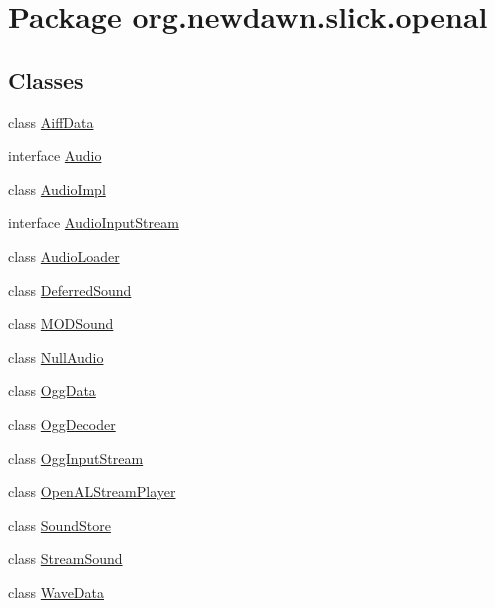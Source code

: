 \hypertarget{namespaceorg_1_1newdawn_1_1slick_1_1openal}{}\section{Package org.\+newdawn.\+slick.\+openal}
\label{namespaceorg_1_1newdawn_1_1slick_1_1openal}
\subsection*{Classes}
\begin{DoxyCompactItemize}
\item 
class \mbox{\hyperlink{classorg_1_1newdawn_1_1slick_1_1openal_1_1_aiff_data}{Aiff\+Data}}
\item 
interface \mbox{\hyperlink{interfaceorg_1_1newdawn_1_1slick_1_1openal_1_1_audio}{Audio}}
\item 
class \mbox{\hyperlink{classorg_1_1newdawn_1_1slick_1_1openal_1_1_audio_impl}{Audio\+Impl}}
\item 
interface \mbox{\hyperlink{interfaceorg_1_1newdawn_1_1slick_1_1openal_1_1_audio_input_stream}{Audio\+Input\+Stream}}
\item 
class \mbox{\hyperlink{classorg_1_1newdawn_1_1slick_1_1openal_1_1_audio_loader}{Audio\+Loader}}
\item 
class \mbox{\hyperlink{classorg_1_1newdawn_1_1slick_1_1openal_1_1_deferred_sound}{Deferred\+Sound}}
\item 
class \mbox{\hyperlink{classorg_1_1newdawn_1_1slick_1_1openal_1_1_m_o_d_sound}{M\+O\+D\+Sound}}
\item 
class \mbox{\hyperlink{classorg_1_1newdawn_1_1slick_1_1openal_1_1_null_audio}{Null\+Audio}}
\item 
class \mbox{\hyperlink{namespaceorg_1_1newdawn_1_1slick_1_1openal_classorg_1_1newdawn_1_1slick_1_1openal_1_1_ogg_data}{Ogg\+Data}}
\item 
class \mbox{\hyperlink{classorg_1_1newdawn_1_1slick_1_1openal_1_1_ogg_decoder}{Ogg\+Decoder}}
\item 
class \mbox{\hyperlink{classorg_1_1newdawn_1_1slick_1_1openal_1_1_ogg_input_stream}{Ogg\+Input\+Stream}}
\item 
class \mbox{\hyperlink{classorg_1_1newdawn_1_1slick_1_1openal_1_1_open_a_l_stream_player}{Open\+A\+L\+Stream\+Player}}
\item 
class \mbox{\hyperlink{classorg_1_1newdawn_1_1slick_1_1openal_1_1_sound_store}{Sound\+Store}}
\item 
class \mbox{\hyperlink{classorg_1_1newdawn_1_1slick_1_1openal_1_1_stream_sound}{Stream\+Sound}}
\item 
class \mbox{\hyperlink{classorg_1_1newdawn_1_1slick_1_1openal_1_1_wave_data}{Wave\+Data}}
\end{DoxyCompactItemize}


